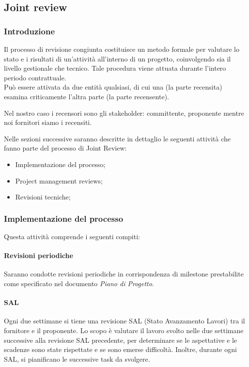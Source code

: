 \subsection{Joint review} 

\subsubsection{Introduzione}
Il processo di revisione congiunta costituisce un metodo formale per valutare lo stato e i risultati di un'attività all'interno di un progetto, coinvolgendo sia il livello gestionale che tecnico. Tale procedura viene attuata durante l'intero periodo contrattuale. \\
Può essere attivata da due entità qualsiasi, di cui una (la parte recensita) esamina criticamente l'altra parte (la parte recensente).

Nel nostro caso i recensori sono gli stakeholder: committente, proponente mentre noi fornitori siamo i recensiti.

Nelle sezioni successive saranno descritte in dettaglio le seguenti attività che fanno parte del processo di Joint Review:
\begin{itemize}
    \item Implementazione del processo;
    \item Project management reviews;
    \item Revisioni tecniche;
\end{itemize}

\subsubsection{Implementazione del processo}
Questa attività comprende i seguenti compiti:

\paragraph{Revisioni periodiche}
Saranno condotte revisioni periodiche in corrispondenza di milestone prestabilite come specificato nel documento \textit{Piano di Progetto}.

\paragraph{SAL}
Ogni due settimane si tiene una revisione SAL (Stato Avanzamento Lavori) tra il fornitore e il proponente. Lo scopo è valutare il lavoro svolto nelle due settimane successive alla revisione SAL precedente, per determinare se le aspettative e le scadenze sono state rispettate e se sono emerse difficoltà. Inoltre, durante ogni SAL, si pianificano le successive task da svolgere.

